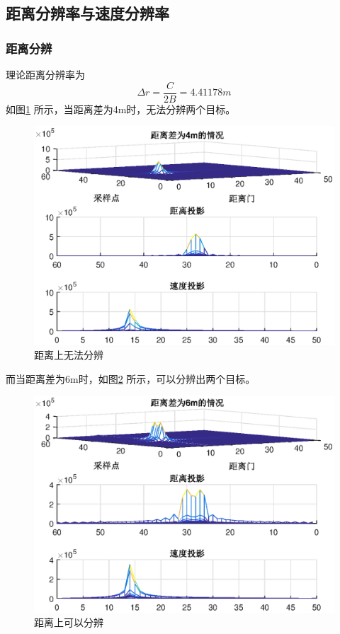\documentclass[12pt]{article}
\begin{document}
\subsection{距离分辨率与速度分辨率}
\subsubsection{距离分辨}
理论距离分辨率为
\begin{equation}\label{julifenbianlv}
  \Delta r=\frac{C}{2B}=4.41178m
\end{equation}
如图\ref{julifenbianlv1}
所示，当距离差为4m时，无法分辨两个目标。
\begin{figure}[htbp]
  \centering
  \includegraphics[width=\textwidth]{julifenbianlv1}
  \caption{距离上无法分辨}\label{julifenbianlv1}
\end{figure}\par
而当距离差为6m时，如图\ref{julifenbianlv2}
所示，可以分辨出两个目标。
\begin{figure}[htbp]
  \centering
  \includegraphics[width=\textwidth]{julifenbianlv2}
  \caption{距离上可以分辨}\label{julifenbianlv2}
\end{figure}
\end{document}
